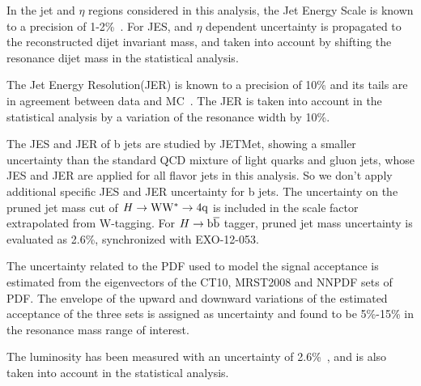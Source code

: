 In the jet \PT and $\eta$ regions considered in this analysis,
the Jet Energy Scale is known to a precision of 1-2\%~\cite{JME-JINST,Collaboration:2013dp}.
For JES, \PT and $\eta$ dependent uncertainty is
propagated to the reconstructed dijet invariant mass,
and taken into account by shifting the resonance dijet mass
 in the statistical analysis.

The Jet Energy Resolution(JER) is known
to a precision of 10\% and its tails are in
agreement between data and MC~\cite{JME-JINST}.
The JER is taken into account in the statistical analysis
 by a variation of the resonance width by 10\%.  


The JES and JER of b jets are studied by JETMet, showing a 
smaller uncertainty than the standard QCD mixture of light quarks and gluon jets, whose JES and JER are applied 
for all flavor jets in this analysis. 
So we don't 
apply additional specific JES and JER uncertainty for b jets. 
The uncertainty on the pruned jet mass cut of $H\to{\rm W}{\rm W}^*\to4{\rm q}$ is included in the scale factor extrapolated
from W-tagging. For $H\to\mathrm{b\overline{b}}$ tagger, pruned jet mass uncertainty is evaluated as 2.6\%, synchronized with
EXO-12-053.  

The uncertainty related to the PDF used to model the signal acceptance is estimated
from the eigenvectors of the CT10, MRST2008 and NNPDF sets of PDF. The 
envelope of the upward and downward variations of the estimated acceptance of the three
 sets is assigned as uncertainty and found to be 5\%-15\% in the resonance mass range of 
interest.    

The luminosity has been measured with 
an uncertainty of 2.6\%~\cite{LUM-13-001}, 
and is also taken into account in the statistical analysis.

